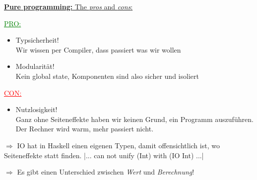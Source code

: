 \documentclass[unknownkeysallowed]{beamer}
\begin{document}
\begin{frame}

\underline{\textbf{Pure programming:}  The \emph{pros} and \emph{cons}:} \pause

\begin{multicols}{2}

\textcolor{green}{\underline{PRO:}} \pause\smallskip

\begin{itemize}
\item Typsicherheit! \\ \footnotesize
      Wir wissen per Compiler, dass passiert was wir wollen \pause \normalsize
\item Modularität! \\ \footnotesize
      Kein global state, Komponenten sind also sicher und isoliert \pause \normalsize
\end{itemize}

\columnbreak

\textcolor{red}{\underline{CON:}} \pause\smallskip

\begin{itemize}
\item Nutzlosigkeit! \\
\footnotesize Ganz ohne Seiteneffekte haben wir keinen Grund, ein Programm auszuführen.\\
\smallskip
\smallskip
Der Rechner wird warm, mehr passiert nicht.
\end{itemize}
\end{multicols}

\pause
$\Rightarrow$ IO hat in Haskell einen eigenen Typen, damit offensichtlich ist, wo Seiteneffekte statt finden.
|... can not unify (Int) with (IO Int) ...|

\pause
$\Rightarrow$ Es gibt einen Unterschied zwischen \emph{Wert} und \emph{Berechnung}!
\end{frame}

\end{document}
